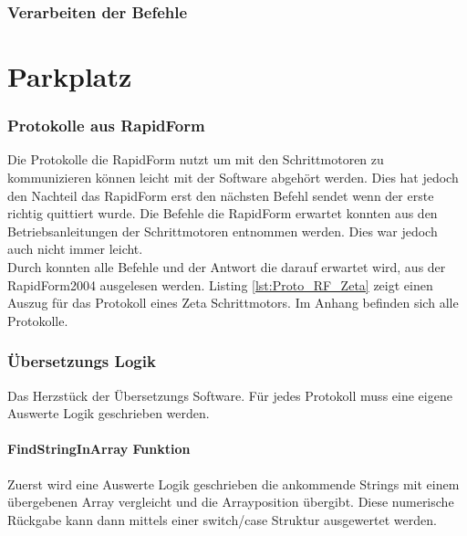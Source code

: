 \lstset{language=Java, basicstyle=\footnotesize, showstringspaces=false, tabsize=8}


\subsection{Verarbeiten der Befehle}


\chapter{Parkplatz}
\subsection{Protokolle aus RapidForm}
Die Protokolle die RapidForm nutzt um mit den Schrittmotoren zu kommunizieren können leicht mit der Software  abgehört werden. Dies hat jedoch den Nachteil das RapidForm erst den nächsten Befehl sendet wenn der erste richtig quittiert wurde. Die Befehle die RapidForm erwartet konnten aus den Betriebsanleitungen der Schrittmotoren entnommen werden. Dies war jedoch auch nicht immer leicht.\\
Durch  konnten alle Befehle und der Antwort die darauf erwartet wird, aus der RapidForm2004 ausgelesen werden. Listing \ref{lst:Proto_RF_Zeta} zeigt einen Auszug für das Protokoll eines Zeta Schrittmotors. Im Anhang befinden sich alle Protokolle.
\lstset{language=C, basicstyle=\footnotesize, showstringspaces=false, tabsize=8}

\subsection{Übersetzungs Logik}
Das Herzstück der Übersetzungs Software. Für jedes Protokoll muss eine eigene Auswerte Logik geschrieben werden. 
\subsubsection{FindStringInArray Funktion}
Zuerst wird eine Auswerte Logik geschrieben die ankommende Strings mit einem übergebenen Array vergleicht und die Arrayposition übergibt. Diese numerische Rückgabe kann dann mittels einer switch/case Struktur ausgewertet werden.
\lstset{language=C, basicstyle=\footnotesize, showstringspaces=false, tabsize=8}

